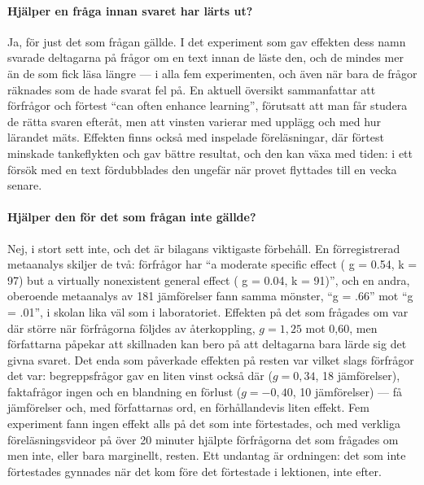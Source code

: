 \paragraph{Hjälper en fråga innan svaret har lärts ut?}
Ja, för just det som frågan gällde.  I det experiment som gav effekten
dess namn svarade deltagarna på frågor om en text innan de läste den,
och de mindes mer än de som fick läsa längre --- i alla fem experimenten,
och även när bara de frågor räknades som de hade svarat fel
på\autocite[243]{Richland2009Pretesting}.  En aktuell översikt
sammanfattar att förfrågor och förtest \enquote{can often enhance
learning}, förutsatt att man får studera de rätta svaren efteråt, men
att vinsten varierar med upplägg och med hur lärandet
mäts\autocite{PanCarpenter2023Prequestioning}.  Effekten finns också med
inspelade föreläsningar, där förtest minskade tankeflykten och gav
bättre resultat\autocite{Pan2020MindWandering}, och den kan växa med
tiden: i ett försök med en text fördubblades den ungefär när provet
flyttades till en vecka senare\autocite{Kliegl2024Pretesting}.

\paragraph{Hjälper den för det som frågan inte gällde?}
Nej, i stort sett inte, och det är bilagans viktigaste förbehåll.  En
förregistrerad metaanalys skiljer de två: förfrågor har \enquote{a
moderate specific effect ( g = 0.54, k = 97) but a virtually nonexistent
general effect ( g = 0.04, k = 91)}\autocite{StHilaire2024Guessing},
och en andra, oberoende metaanalys av 181 jämförelser fann samma
mönster, \enquote{g = .66} mot \enquote{g = .01}, i skolan lika väl som
i laboratoriet\autocite[22, 36]{KingShepard2025Prequestions}.  Effekten
på det som frågades om var där större när förfrågorna följdes av
återkoppling, \(g = 1{,}25\) mot 0,60, men författarna påpekar att
skillnaden kan bero på att deltagarna bara lärde sig det givna
svaret\autocite[33, 38]{KingShepard2025Prequestions}.  Det enda som
påverkade effekten på resten var vilket slags förfrågor det var:
begreppsfrågor gav en liten vinst också där (\(g = 0{,}34\), 18
jämförelser), faktafrågor ingen och en blandning en förlust
(\(g = -0{,}40\), 10 jämförelser) --- få jämförelser och, med
författarnas ord, en förhållandevis liten
effekt\autocite[33, 38]{KingShepard2025Prequestions}.
Fem experiment fann ingen effekt alls på det som inte
förtestades\autocite{JamesStorm2019Pretesting},
och med verkliga föreläsningsvideor på över 20 minuter hjälpte
förfrågorna det som frågades om men inte, eller bara marginellt,
resten\autocite{Toftness2018Prequestions}.  Ett undantag är ordningen:
det som inte förtestades gynnades när det kom före det förtestade i
lektionen, inte efter\autocite{SanaCarpenter2023Placement}.

